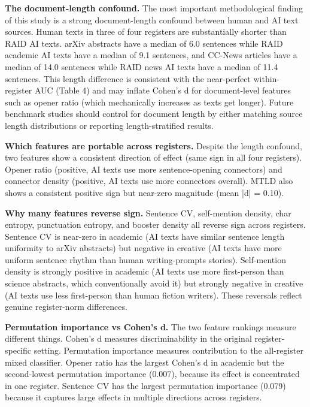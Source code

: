 \documentclass{article}
\begin{document}
\textbf{The document-length confound.} The most important methodological finding of this study is a strong document-length confound between human and AI text sources. Human texts in three of four registers are substantially shorter than RAID AI texts. arXiv abstracts have a median of 6.0 sentences while RAID academic AI texts have a median of 9.1 sentences, and CC-News articles have a median of 14.0 sentences while RAID news AI texts have a median of 11.4 sentences. This length difference is consistent with the near-perfect within-register AUC (Table 4) and may inflate Cohen's d for document-level features such as opener ratio (which mechanically increases as texts get longer). Future benchmark studies should control for document length by either matching source length distributions or reporting length-stratified results.

\textbf{Which features are portable across registers.} Despite the length confound, two features show a consistent direction of effect (same sign in all four registers). Opener ratio (positive, AI texts use more sentence-opening connectors) and connector density (positive, AI texts use more connectors overall). MTLD also shows a consistent positive sign but near-zero magnitude (mean |d| = 0.10).

\textbf{Why many features reverse sign.} Sentence CV, self-mention density, char entropy, punctuation entropy, and booster density all reverse sign across registers. Sentence CV is near-zero in academic (AI texts have similar sentence length uniformity to arXiv abstracts) but negative in creative (AI texts have more uniform sentence rhythm than human writing-prompts stories). Self-mention density is strongly positive in academic (AI texts use more first-person than science abstracts, which conventionally avoid it) but strongly negative in creative (AI texts use less first-person than human fiction writers). These reversals reflect genuine register-norm differences.

\textbf{Permutation importance vs Cohen's d.} The two feature rankings measure different things. Cohen's d measures discriminability in the original register-specific setting. Permutation importance measures contribution to the all-register mixed classifier. Opener ratio has the largest Cohen's d in academic but the second-lowest permutation importance (0.007), because its effect is concentrated in one register. Sentence CV has the largest permutation importance (0.079) because it captures large effects in multiple directions across registers.
\end{document}
